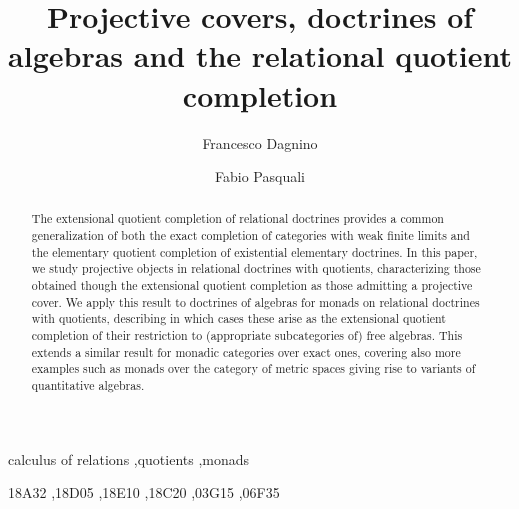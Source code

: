 \documentclass[preprint,12pt]{elsarticle}
\theoremstyle{theorem}
\theoremstyle{definition}
\begin{document}
\begin{frontmatter}



\title{Projective covers, doctrines of algebras and the relational quotient completion} 

\author[fd]{Francesco Dagnino}

\author[fp]{Fabio Pasquali}





\begin{abstract}
The extensional quotient completion of relational doctrines provides  a common generalization of both 
the exact completion of categories with weak finite limits and 
the elementary quotient completion of existential elementary doctrines. 
% 
In this paper, we study projective objects  in relational doctrines with quotients, characterizing those obtained though the extensional quotient completion as those admitting a projective cover. 
We apply this result to doctrines of algebras for monads on relational doctrines with quotients, describing in which cases these arise as the extensional quotient completion of their restriction to (appropriate subcategories of) free algebras. 
This extends a similar result for monadic categories over exact ones, 
covering also more examples such as monads over the category of metric spaces giving rise to variants of quantitative algebras. 
\end{abstract}

\begin{keyword}
calculus of relations \sep quotients  \sep monads


\MSC 18A32 \sep 18D05 \sep 18E10 \sep  18C20    \sep 03G15 \sep 06F35

\end{keyword}

\end{frontmatter}




 
 
 


 

\end{document}
